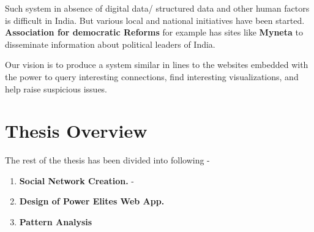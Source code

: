 Such system in absence of digital data/ structured data and other human factors is difficult in India. But various local and national initiatives have been started. \textbf{Association for democratic Reforms} \cite{ADR} for example has sites like \textbf{Myneta} \cite{MyNeta} to disseminate information about political leaders of India.	

Our vision is to produce a system similar in lines to the websites embedded with the power to query interesting connections, find interesting visualizations, and help raise suspicious issues.

\section{Thesis Overview}
The rest of the thesis has been divided into following -
\begin{enumerate}
    \item \textbf{Social Network Creation.} - 
    \item \textbf{Design of Power Elites Web App.} 
    \item \textbf{Pattern Analysis}

\end{enumerate}



%
%

